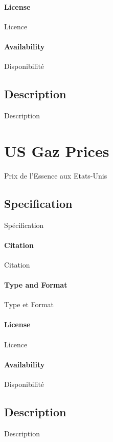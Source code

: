\paragraph{License}{Licence}

\paragraph{Availability}{Disponibilité}


\subsection{Description}{Description}



\section{US Gaz Prices}{Prix de l'Essence aux Etats-Unis}


\subsection{Specification}{Spécification}

\paragraph{Citation}{Citation}

\paragraph{Type and Format}{Type et Format}

\paragraph{License}{Licence}

\paragraph{Availability}{Disponibilité}




\subsection{Description}{Description}






